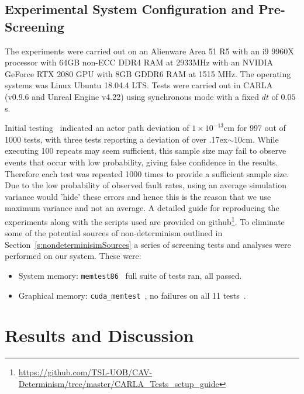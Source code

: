 \subsection{Experimental System Configuration and Pre-Screening}\label{s:screening}
The experiments were carried out on an Alienware Area 51 R5 with an i9 9960X processor with 64GB non-ECC DDR4 RAM at 2933MHz with an NVIDIA GeForce RTX 2080 GPU with 8GB GDDR6 RAM at 1515 MHz. The operating systems was Linux Ubuntu 18.04.4 LTS. Tests were carried out in CARLA (v0.9.6 and Unreal Engine v4.22) using synchronous mode with a fixed $dt$ of $0.05$s. 

Initial testing~\cite{TSLUnrealEngineTesting} indicated an actor path deviation of $1\times10^{-13}$cm for 997 out of 1000 tests, with three tests reporting a deviation of over {\raise.17ex\hbox{$\scriptstyle\sim$}}$10$cm. While executing 100 repeats may seem sufficient, this sample size may fail to observe events that occur with low probability, giving false confidence in the results. Therefore each test was repeated 1000 times to provide a sufficient sample size. 
%
Due to the low probability of observed fault rates, using an average simulation variance would 'hide' these errors and hence this is the reason that we use maximum variance and not an average. 
%
A detailed guide for reproducing the experiments along with the scripts used are provided on github\footnote{\url{https://github.com/TSL-UOB/CAV-Determinism/tree/master/CARLA_Tests_setup_guide}}. To eliminate some of the potential sources of non-determinism outlined in Section~\ref{s:nondeterminisimSources} a series of screening tests and analyses were performed on our system. These were:

\begin{itemize}[leftmargin=*]
    \item System memory: \texttt{memtest86}~\cite{MemTest86} full suite of tests ran, all passed.
    \item Graphical memory: \texttt{cuda\_memtest}~\cite{cuda_memtest}, no failures on all 11 tests~\cite{shi2009testing}.
\end{itemize}

\section{Results and Discussion}\label{s:FinalResultsSection}

